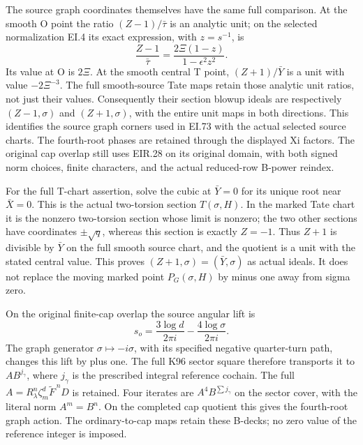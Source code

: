 The source graph coordinates themselves have the same full
comparison. At the smooth O point the ratio
\((Z-1)/\bar\tau\) is an analytic unit; on the selected
normalization EI.4 its exact expression, with \(z=s^{-1}\), is
\[
 \frac{Z-1}{\bar\tau}
    =\frac{2\Xi(1-z)}{1-\epsilon^2z^2}.
 \tag{EI.79}
\]
Its value at O is \(2\Xi\). At the smooth central T point,
\((Z+1)/\bar Y\) is a unit with value \(-2\Xi^{-3}\).
The full smooth-source Tate maps retain those analytic unit
ratios, not just their values. Consequently their section
blowup ideals are respectively \((Z-1,\sigma)\) and
\((Z+1,\sigma)\), with the entire unit maps in both
directions. This identifies the source graph corners used
in EI.73 with the actual selected source charts. The
fourth-root phases are retained through the displayed Xi
factors. The original cap overlap still uses EIR.28 on its
original domain, with both signed norm choices, finite
characters, and the actual reduced-row B-power reindex.

For the full T-chart assertion, solve the cubic at \(\bar Y=0\)
for its unique root near \(\bar X=0\). This is the actual
two-torsion section \(T(\sigma,H)\). In the marked Tate chart
it is the nonzero two-torsion section whose limit is nonzero;
the two other sections have coordinates \(\pm\sqrt q\),
whereas this section is exactly \(Z=-1\). Thus \(Z+1\) is
divisible by \(\bar Y\) on the full smooth source chart,
and the quotient is a unit with the stated central value.
This proves \((Z+1,\sigma)=(\bar Y,\sigma)\) as actual
ideals. It does not replace the moving marked point
\(P_G(\sigma,H)\) by minus one away from sigma zero.

On the original finite-cap overlap the source angular lift is
\[
 s_o=\frac{3\log d}{2\pi i}-\frac{4\log\sigma}{2\pi i}.
 \tag{EI.80}
\]
The graph generator \(\sigma\mapsto-i\sigma\), with its
specified negative quarter-turn path, changes this lift by
plus one. The full K96 sector square therefore transports it
to \(A B^{j_\gamma}\), where \(j_\gamma\) is the prescribed
integral reference cochain. The full
\(A=R_\lambda^n\zeta_m^d\widetilde F^{\,n}D\) is retained.
Four iterates are \(A^4B^{\sum j_\gamma}\) on the sector
cover, with the literal norm \(A^m=B^n\). On the completed
cap quotient this gives the fourth-root graph action. The
ordinary-to-cap maps retain these B-decks; no zero value of
the reference integer is imposed.

